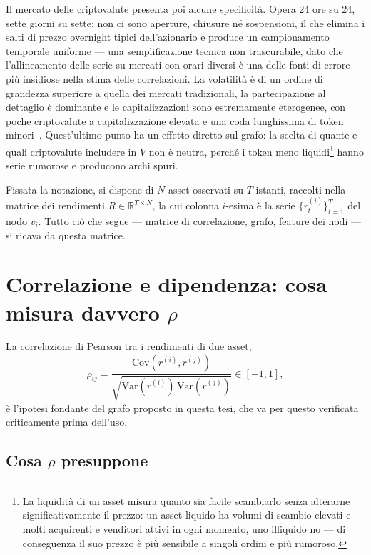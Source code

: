 Il mercato delle criptovalute presenta poi alcune specificità. Opera 24 ore su 24, sette giorni su sette: non ci sono aperture, chiusure né sospensioni, il che elimina i salti di prezzo overnight tipici dell'azionario e produce un campionamento temporale uniforme — una semplificazione tecnica non trascurabile, dato che l'allineamento delle serie su mercati con orari diversi è una delle fonti di errore più insidiose nella stima delle correlazioni. La volatilità è di un ordine di grandezza superiore a quella dei mercati tradizionali, la partecipazione al dettaglio è dominante e le capitalizzazioni sono estremamente eterogenee, con poche criptovalute a capitalizzazione elevata e una coda lunghissima di token minori~\cite{corbet2019cryptocurrencies}. Quest'ultimo punto ha un effetto diretto sul grafo: la scelta di quante e quali criptovalute includere in $V$ non è neutra, perché i token meno liquidi\footnote{La liquidità di un asset misura quanto sia facile scambiarlo senza alterarne significativamente il prezzo: un asset liquido ha volumi di scambio elevati e molti acquirenti e venditori attivi in ogni momento, uno illiquido no — di conseguenza il suo prezzo è più sensibile a singoli ordini e più rumoroso.} hanno serie rumorose e producono archi spuri.

Fissata la notazione, si dispone di $N$ asset osservati su $T$ istanti, raccolti nella matrice dei rendimenti $R\in\mathbb{R}^{T\times N}$, la cui colonna $i$-esima è la serie $\{r_t^{(i)}\}_{t=1}^{T}$ del nodo $v_i$. Tutto ciò che segue — matrice di correlazione, grafo, feature dei nodi — si ricava da questa matrice.

\section{Correlazione e dipendenza: cosa misura davvero \texorpdfstring{$\rho$}{rho}}
\label{sec:correlation-dependence-pitfalls}

La correlazione di Pearson tra i rendimenti di due asset,
\begin{equation}
\label{eq:pearson}
\rho_{ij} = \frac{\mathrm{Cov}(r^{(i)},r^{(j)})}{\sqrt{\mathrm{Var}(r^{(i)})\,\mathrm{Var}(r^{(j)})}} \in [-1,1],
\end{equation}
è l'ipotesi fondante del grafo proposto in questa tesi, che va per questo verificata criticamente prima dell'uso.

\subsection{Cosa $\rho$ presuppone}

